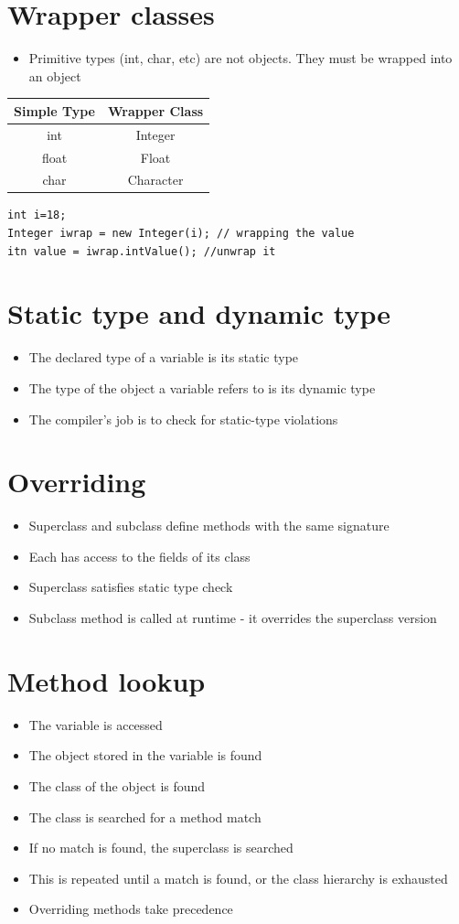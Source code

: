 \documentclass{article}[18pt]
\begin{document}
\section{Wrapper classes}
\begin{itemize}
	\item Primitive types (int, char, etc) are not objects. They must be wrapped into an object
\end{itemize}
\begin{tabular}{|c|c|}
	\hline
	Simple Type & Wrapper Class \\
	\hline
	int & Integer \\
	\hline
	float & Float \\
	\hline
	char & Character \\
	\hline
\end{tabular}
\begin{verbatim}
int i=18;
Integer iwrap = new Integer(i); // wrapping the value
itn value = iwrap.intValue(); //unwrap it
\end{verbatim}
\section{Static type and dynamic type}
\begin{itemize}
	\item The declared type of a variable is its static type
	\item The type of the object a variable refers to is its dynamic type
	\item The compiler's job is to check for static-type violations
\end{itemize}
\section{Overriding}
\begin{itemize}
	\item Superclass and subclass define methods with the same signature
	\item Each has access to the fields of its class
	\item Superclass satisfies static type check
	\item Subclass method is called at runtime - it overrides the superclass version
\end{itemize}
\section{Method lookup}
\begin{itemize}
	\item The variable is accessed
	\item The object stored in the variable is found
	\item The class of the object is found
	\item The class is searched for a method match
	\item If no match is found, the superclass is searched
	\item This is repeated until a match is found, or the class hierarchy is exhausted
	\item Overriding methods take precedence
\end{itemize}
\end{document}
